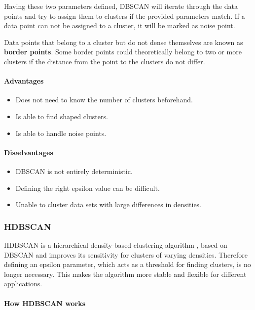 Having these two parameters defined, DBSCAN will iterate through the data points
and try to assign them to clusters if the provided parameters match.
If a data point can not be assigned to a cluster, it will be marked as noise point.

Data points that belong to a cluster but do not dense themselves are known as \textbf{border points}.
Some border points could theoretically belong to two or more clusters
if the distance from the point to the clusters do not differ.

\paragraph{Advantages}
\begin{itemize}
    \item Does not need to know the number of clusters beforehand.
    \item Is able to find shaped clusters.
    \item Is able to handle noise points.
\end{itemize}

\paragraph{Disadvantages}
\begin{itemize}
    \item DBSCAN is not entirely deterministic.
    \item Defining the right epsilon value can be difficult.
    \item Unable to cluster data sets with large differences in densities.
\end{itemize}

\subsubsection{HDBSCAN}

HDBSCAN is a hierarchical density-based clustering algorithm \cite{McInnes2017}, based on DBSCAN and improves its sensitivity for clusters of varying densities. Therefore defining an epsilon parameter, which acts as a threshold for finding clusters, is no longer necessary. This makes the algorithm more stable and flexible for different applications. 


\paragraph{How HDBSCAN works}


